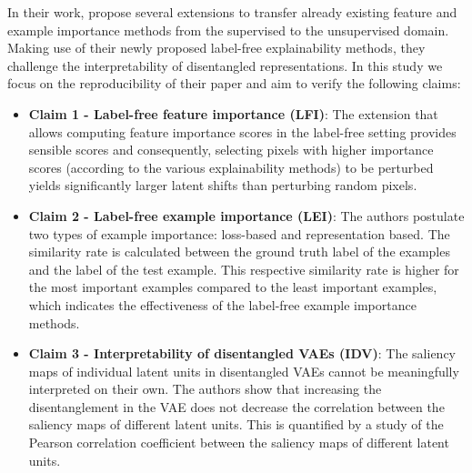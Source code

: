 In their work, \citeauthor{LabelFreeExplainability} propose several extensions to transfer already existing feature and example importance methods from the supervised to the unsupervised domain. Making use of their newly proposed label-free explainability methods, they challenge the interpretability of disentangled representations. In this study we focus on the reproducibility of their paper and aim to verify the following claims:
\begin{itemize}
    \item \textbf{Claim 1 - Label-free feature importance (LFI)}: The extension that allows computing feature importance scores in the label-free setting provides sensible scores and consequently, selecting pixels with higher importance scores (according to the various explainability methods) to be perturbed yields significantly larger latent shifts than perturbing random pixels.
    
    \item \textbf{Claim 2 - Label-free example importance (LEI)}: The authors postulate two types of example importance: loss-based and representation based. The similarity rate is calculated between the ground truth label of the examples and the label of the test example. This respective similarity rate is higher for the most important examples compared to the least important examples, which indicates the effectiveness of the label-free example importance methods.
    
    \item \textbf{Claim 3 - Interpretability of disentangled VAEs (IDV)}: The saliency maps of individual latent units in  disentangled VAEs cannot be meaningfully interpreted on their own. The authors show that increasing the disentanglement in the VAE does not decrease the correlation between the saliency maps of different latent units. This is quantified by a study of the Pearson correlation coefficient between the saliency maps of different latent units. 

 \end{itemize}


